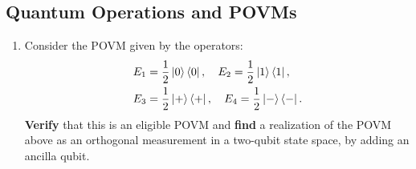 \documentclass[12pt,a4paper]{article}
\begin{document}
\subsection{Quantum Operations and POVMs}
\begin{enumerate}
    \item Consider the POVM given by the operators:
    \begin{align*}
        E_1 &= \frac{1}{2} \ket{0}\bra{0}, \quad E_2 = \frac{1}{2} \ket{1}\bra{1}, \\
        E_3 &= \frac{1}{2} \ket{+}\bra{+}, \quad E_4 = \frac{1}{2} \ket{-}\bra{-}.
    \end{align*}
    \textbf{Verify} that this is an eligible POVM and \textbf{find} a realization of the POVM above as an orthogonal measurement in a two-qubit state space, by adding an ancilla qubit.


\end{enumerate}
\end{document}
